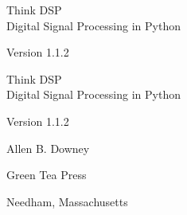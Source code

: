 \documentclass[12pt]{book} \usepackage[width=5.5in,height=8.5in, hmarginratio=3:2,vmarginratio=1:1]{geometry}
\newcommand{\thetitle}{Think DSP} \newcommand{\thesubtitle}{Digital Signal Processing in Python} \newcommand{\theversion}{1.1.2}
\begin{document}
\begin{latexonly} 

\renewcommand{\topfraction}{0.9} \renewcommand{\blankpage}{\thispagestyle{empty} \quad \newpage} 

\thispagestyle{empty} 

\begin{flushright} \vspace*{2.0in} 

\begin{spacing}{3} {\huge \thetitle}\\ {\Large \thesubtitle} \end{spacing} 

\vspace{0.25in} 

Version \theversion

\vfill

\end{flushright} 

\blankpage

\blankpage

\pagebreak

\thispagestyle{empty} 

\begin{flushright} \vspace*{2.0in} 

\begin{spacing}{3} {\huge \thetitle}\\ {\Large \thesubtitle} \end{spacing} 

\vspace{0.25in} 

Version \theversion

\vspace{1in} 

{\Large Allen B. Downey\\ } 

\vspace{0.5in} 

{\Large Green Tea Press} 

{\small Needham, Massachusetts} 

\vfill

\end{flushright} 

\pagebreak


\end{latexonly}
\end{document}
